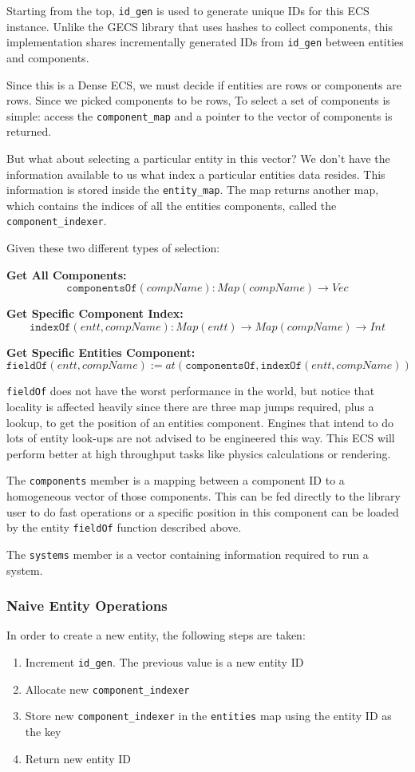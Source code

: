 Starting from the top, \texttt{id\_gen} is used to generate unique IDs for this ECS instance. Unlike the GECS library that uses hashes to collect components, this implementation shares incrementally generated IDs from \texttt{id\_gen} between entities and components.

Since this is a Dense ECS, we must decide if entities are rows or components are rows. Since we picked components to be rows, To select a set of components is simple: access the \texttt{component\_map} and a pointer to the vector of components is returned. 

But what about selecting a particular entity in this vector? We don't have the information available to us what index a particular entities data resides. This information is stored inside the \texttt{entity\_map}. The map returns another map, which contains the indices of all the entities components, called the \texttt{component\_indexer}. 

Given these two different types of selection:

\textbf{Get All Components:} 
$$\texttt{componentsOf}(compName) : Map(compName) \rightarrow Vec $$

\textbf{Get Specific Component Index:} 
$$\texttt{indexOf}(entt, compName): Map(entt) \rightarrow Map(compName) \rightarrow Int$$

\textbf{Get Specific Entities Component:} 
$$\texttt{fieldOf}(entt, compName) := at(\texttt{componentsOf}, \texttt{indexOf}(entt, compName))$$

\texttt{fieldOf} does not have the worst performance in the world, but notice that locality is affected heavily since there are three map jumps required, plus a lookup, to get the position of an entities component. Engines that intend to do lots of entity look-ups are not advised to be engineered this way. This ECS will perform better at high throughput tasks like physics calculations or rendering.

The \texttt{components} member is a mapping between a component ID to a homogeneous vector of those components. This can be fed directly to the library user to do fast operations or a specific position in this component can be loaded by the entity \texttt{fieldOf} function described above.

The \texttt{systems} member is a vector containing information required to run a system.

\subsubsection{Naive Entity Operations}
In order to create a new entity, the following steps are taken:
\begin{enumerate}
    \item Increment \texttt{id\_gen}. The previous value is a new entity ID
    \item Allocate new \texttt{component\_indexer}
    \item Store new \texttt{component\_indexer} in the \texttt{entities} map using the entity ID as the key
    \item Return new entity ID
\end{enumerate}

